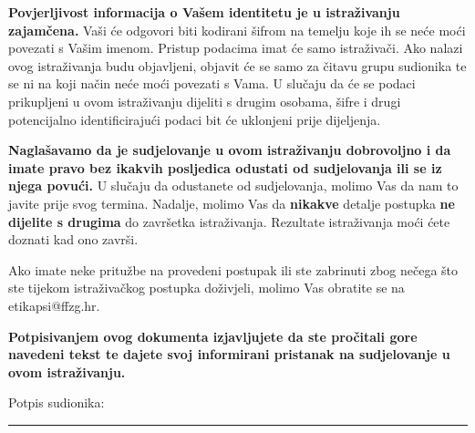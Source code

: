 \documentclass[11pt]{article}
\begin{document}
\textbf{Povjerljivost informacija o Vašem identitetu je u istraživanju
zajamčena.} Vaši će odgovori biti kodirani šifrom na temelju koje ih se neće
moći povezati s Vašim imenom. Pristup podacima imat će samo istraživači. Ako
nalazi ovog istraživanja budu objavljeni, objavit će se samo za čitavu grupu
sudionika te se ni na koji način neće moći povezati s Vama. U slučaju da će se
podaci prikupljeni u ovom istraživanju dijeliti s drugim osobama, šifre i drugi
potencijalno identificirajući podaci bit će uklonjeni prije dijeljenja.

\textbf{Naglašavamo da je sudjelovanje u ovom istraživanju dobrovoljno i da
imate pravo bez ikakvih posljedica odustati od sudjelovanja ili se iz njega
povući.} U slučaju da odustanete od sudjelovanja, molimo Vas da nam to javite
prije svog termina.
Nadalje, molimo Vas da \textbf{nikakve} detalje postupka \textbf{ne dijelite s
drugima} do završetka istraživanja. Rezultate istraživanja moći ćete doznati
kad ono završi.

\vspace{2em}

\noindent Ako imate neke pritužbe na provedeni postupak ili ste
zabrinuti zbog nečega što ste tijekom istraživačkog postupka doživjeli, molimo
Vas obratite se na etikapsi@ffzg.hr.

\vspace{2em}

\noindent \textbf{Potpisivanjem ovog dokumenta izjavljujete da ste pročitali
    gore navedeni tekst te dajete svoj informirani pristanak na sudjelovanje u
ovom istraživanju.} 
\vspace*{5em}

\noindent Potpis sudionika: \rule{6cm}{0.15mm}
\end{document}
